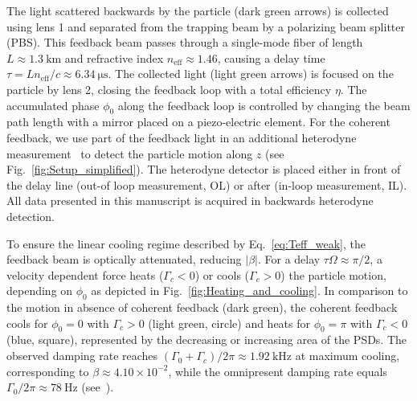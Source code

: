 \documentclass[reprint,aps,prl,superscriptaddress]{revtex4-2}
\begin{document}
The light scattered backwards by the particle (dark green arrows) is collected using lens 1 and separated from the trapping beam by a polarizing beam splitter (PBS). This feedback beam passes through a single-mode fiber of length $L\approx \SI{1.3}{\kilo\meter}$ and refractive index $n_\text{eff}\approx1.46$, causing a delay time $\tau = L n_\text{eff}/c\approx \SI{6.34}{\micro\second}$. The collected light (light green arrows) is focused on the particle by lens 2, closing the feedback loop with a total efficiency $\eta$. The accumulated phase $\phi_0$ along the feedback loop is controlled by changing the beam path length with a mirror placed on a piezo-electric element. For the coherent feedback, we use part of the feedback light in an additional heterodyne measurement~\cite{magrini2021real,tebbenjohanns2021quantum} to detect the particle motion along $z$ (see Fig.~\ref{fig:Setup_simplified}). The heterodyne detector is placed either in front of the delay line (out-of loop measurement, OL) or after (in-loop measurement, IL).  
All data presented in this manuscript is acquired in backwards heterodyne detection. 


To ensure the linear cooling regime described by Eq.~\ref{eq:Teff_weak}, the feedback beam is optically attenuated, reducing $|\beta|$. For a delay $\tau\Omega \approx \pi/2$, a velocity dependent force heats ($\Gamma_c <0$) or cools  ($\Gamma_c >0$) the particle motion, depending on $\phi_0$ as depicted in Fig.~\ref{fig:Heating_and_cooling}. In comparison to the motion in absence of coherent feedback  %
(dark green), the coherent feedback cools for $\phi_0=0$ with $\Gamma_c>0$ (light green, circle) and heats for $\phi_0 = \pi$ with $\Gamma_c<0$ (blue, square), represented by the decreasing or increasing area of the PSDs.
The observed damping rate reaches $(\Gamma_0+\Gamma_c)/2\pi\approx\SI{1.92}{\kilo\hertz}$ at maximum cooling, corresponding to $\beta\approx4.10\times10^{-2}$, while the omnipresent damping rate equals $\Gamma_0/2\pi\approx\SI{78}{\hertz}$ (see~\cite{SM}). %
\end{document}
